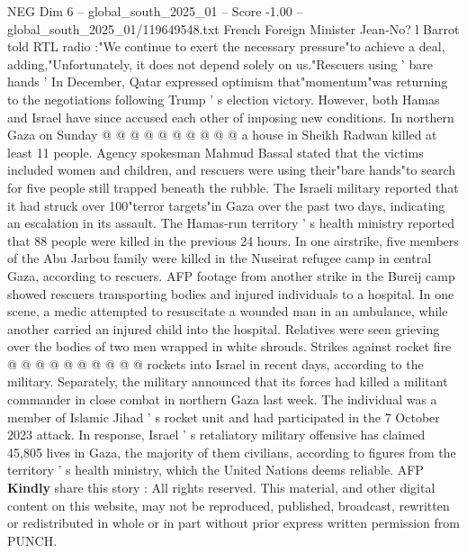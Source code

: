 \begin{textsample}{NEG Dim 6 – global\_south\_2025\_01 – Score -1.00 – global\_south\_2025\_01/119649548.txt}
French Foreign Minister Jean-No? l Barrot told RTL radio :"We continue to exert the necessary pressure"to achieve a deal, adding,"Unfortunately, it does not depend solely on us."Rescuers using ' bare hands ' In December, Qatar expressed optimism that"momentum"was returning to the negotiations following Trump ' s election victory.
However, both Hamas and Israel have since accused each other of imposing new conditions.
In northern Gaza on Sunday @ @ @ @ @ @ @ @ @ @ a house in Sheikh Radwan killed at least 11 people.
Agency spokesman Mahmud Bassal stated that the victims included women and children, and rescuers were using their"bare hands"to search for five people still trapped beneath the rubble.
The Israeli military reported that it had struck over 100"terror targets"in Gaza over the past two days, indicating an escalation in its assault.
The Hamas-run territory ' s health ministry reported that 88 people were killed in the previous 24 hours.
In one airstrike, five members of the Abu Jarbou family were killed in the Nuseirat refugee camp in central Gaza, according to rescuers.
AFP footage from another strike in the Bureij camp showed rescuers transporting bodies and injured individuals to a hospital.
In one scene, a medic attempted to resuscitate a wounded man in an ambulance, while another carried an injured child into the hospital.
Relatives were seen grieving over the bodies of two men wrapped in white shrouds.
Strikes against rocket fire @ @ @ @ @ @ @ @ @ @ rockets into Israel in recent days, according to the military.
Separately, the military announced that its forces had killed a militant commander in close combat in northern Gaza last week.
The individual was a member of Islamic Jihad ' s rocket unit and had participated in the 7 October 2023 attack.
In response, Israel ' s retaliatory military offensive has claimed 45,805 lives in Gaza, the majority of them civilians, according to figures from the territory ' s health ministry, which the United Nations deems reliable.
AFP \textbf{Kindly} share this story : All rights reserved.
This material, and other digital content on this website, may not be reproduced, published, broadcast, rewritten or redistributed in whole or in part without prior express written permission from PUNCH.

\end{textsample}
